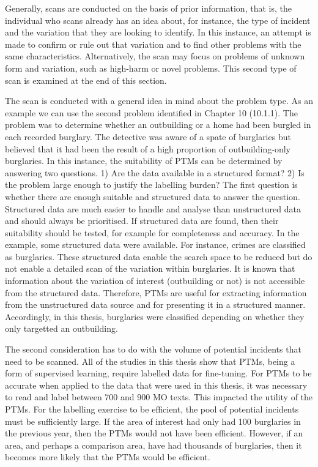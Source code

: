Generally, scans are conducted on the basis of prior information, that is, the individual who scans already has an idea about, for instance, the type of incident and the variation that they are looking to identify. In this instance, an attempt is made to confirm or rule out that variation and to find other problems with the same characteristics. Alternatively, the scan may focus on problems of unknown form and variation, such as high-harm or novel problems. This second type of scan is examined at the end of this section. 

The scan is conducted with a general idea in mind about the problem type. As an example we can use the second problem identified in Chapter 10 (10.1.1). The problem was to determine whether an outbuilding or a home had been burgled in each recorded burglary. The detective was aware of a spate of burglaries but believed that it had been the result of a high proportion of outbuilding-only burglaries. In this instance, the suitability of PTMs can be determined by answering two questions. 1) Are the data available in a structured format? 2) Is the problem large enough to justify the labelling burden? The first question is whether there are enough suitable and structured data to answer the question. Structured data are much easier to handle and analyse than unstructured data and should always be prioritised. If structured data are found, then their suitability should be tested, for example for completeness and accuracy. In the example, some structured data were available. For instance, crimes are classified as burglaries. These structured data enable the search space to be reduced but do not enable a detailed scan of the variation within burglaries. It is known that information about the variation of interest (outbuilding or not) is not accessible from the structured data. Therefore, PTMs are useful for extracting information from the unstructured data source and for presenting it in a structured manner. Accordingly, in this thesis, burglaries were classified depending on whether they only targetted an outbuilding.

The second consideration has to do with the volume of potential incidents that need to be scanned. All of the studies in this thesis show that PTMs, being a form of supervised learning, require labelled data for fine-tuning. For PTMs to be accurate when applied to the data that were used in this thesis, it was necessary to read and label between 700 and 900 MO texts. This impacted the utility of the PTMs. For the labelling exercise to be efficient, the pool of potential incidents must be sufficiently large. If the area of interest had only had 100 burglaries in the previous year, then the PTMs would not have been efficient. However, if an area, and perhaps a comparison area, have had thousands of burglaries, then it becomes more likely that the PTMs would be efficient.

